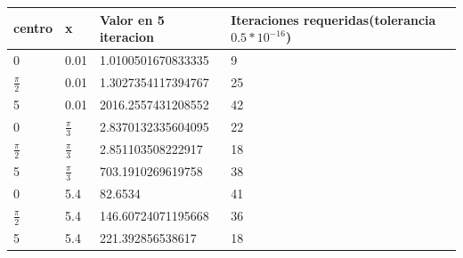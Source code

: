 \documentclass[12pt]{article}
\begin{document}
        \begin{center}
            \begin{tabular}{|l|l|l|l|} \hline
            centro & x & Valor en 5 iteracion & Iteraciones requeridas(tolerancia $0.5*10^{-16}$)\\
            \hline \hline
            0 & 0.01 &  1.0100501670833335 & 9 \\
            \hline 
            $\frac{\pi}{2}$ & 0.01 & 1.3027354117394767 & 25 \\
            \hline
            5 & 0.01 & 2016.2557431208552 & 42 \\
            \hline
            0 &$\frac{\pi}{3}$ &  2.8370132335604095 & 22 \\
            \hline 
            $\frac{\pi}{2}$ & $\frac{\pi}{3}$ & 2.851103508222917 & 18 \\
            \hline
            5 & $\frac{\pi}{3}$ & 703.1910269619758 & 38 \\
            \hline
            0 & 5.4 &  82.6534  & 41 \\
            \hline 
            $\frac{\pi}{2}$ & 5.4 & 146.60724071195668 & 36 \\
            \hline
            5 & 5.4 & 221.392856538617 & 18 \\
            \hline
            \end{tabular}
        \end{center}
    
\end{document}
